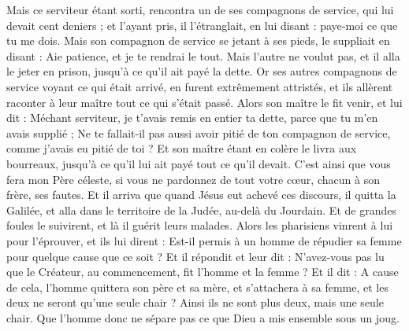 \begin{multicols}{2}
Mais ce serviteur étant sorti, rencontra un de ses compagnons de service, qui lui devait cent deniers ; et l'ayant pris, il l'étranglait, en lui disant : paye-moi ce que tu me dois.
Mais son compagnon de service se jetant à ses pieds, le suppliait en disant : Aie patience, et je te rendrai le tout.
Mais l'autre ne voulut pas, et il alla le jeter en prison, jusqu'à ce qu'il ait payé la dette.
Or ses autres compagnons de service voyant ce qui était arrivé, en furent extrêmement attristés, et ils allèrent raconter à leur maître tout ce qui s'était passé.
Alors son maître le fit venir, et lui dit : Méchant serviteur, je t'avais remis en entier ta dette, parce que tu m'en avais supplié ;
Ne te fallait-il pas aussi avoir pitié de ton compagnon de service, comme j'avais eu pitié de toi ?
Et son maître étant en colère le livra aux bourreaux, jusqu'à ce qu'il lui ait payé tout ce qu'il devait.
C'est ainsi que vous fera mon Père céleste, si vous ne pardonnez de tout votre cœur, chacun à son frère, ses fautes.
\VerseOne{}Et il arriva que quand Jésus eut achevé ces discours, il quitta la Galilée, et alla dans le territoire de la Judée, au-delà du Jourdain.
Et de grandes foules le suivirent, et là il guérit leurs malades.
Alors les pharisiens vinrent à lui pour l'éprouver, et ils lui dirent : Est-il permis à un homme de répudier sa femme pour quelque cause que ce soit ?
Et il répondit et leur dit : N'avez-vous pas lu que le Créateur, au commencement, fit l'homme et la femme ?
Et il dit : A cause de cela, l'homme quittera son père et sa mère, et s'attachera à sa femme, et les deux ne seront qu'une seule chair ?
Ainsi ils ne sont plus deux, mais une seule chair. Que l'homme donc ne sépare pas ce que Dieu a mis ensemble sous un joug.

\end{multicols}
